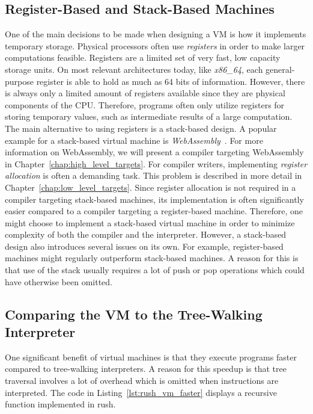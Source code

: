\subsection{Register-Based and Stack-Based Machines}

One of the main decisions to be made when designing a VM is how it implements temporary storage.
Physical processors often use \emph{registers} in order to make larger computations feasible.
Registers are a limited set of very fast, low capacity storage units.
On most relevant architectures today, like \emph{x86\_64}, each general-purpose register is able to hold as much as 64 bits of information.
However, there is always only a limited amount of registers available since they are physical components of the CPU\@.
Therefore, programs often only utilize registers for storing temporary values, such as intermediate results of a large computation.
The main alternative to using registers is a stack-based design.
A popular example for a stack-based virtual machine is \emph{WebAssembly}~\cite[p.~44]{Sendil2022-fy}.
For more information on WebAssembly, we will present a compiler targeting WebAssembly in Chapter~\ref{chap:high_level_targets}.
For compiler writers, implementing \emph{register allocation} is often a demanding task.
This problem is described in more detail in Chapter~\ref{chap:low_level_targets}.
Since register allocation is not required in a compiler targeting stack-based machines, its implementation is often significantly easier compared to a compiler targeting a register-based machine.
Therefore, one might choose to implement a stack-based virtual machine in order to minimize complexity of both the compiler and the interpreter.
However, a stack-based design also introduces several issues on its own.
For example, register-based machines might regularly outperform stack-based machines.
A reason for this is that use of the stack usually requires a lot of push or pop operations which could have otherwise been omitted.

\subsection{Comparing the VM to the Tree-Walking Interpreter}
One significant benefit of virtual machines is that they execute programs faster compared to tree-walking interpreters.
A reason for this speedup is that tree traversal involves a lot of overhead which is omitted when instructions are interpreted.
The code in Listing~\ref{lst:rush_vm_faster} displays a recursive function implemented in rush.

